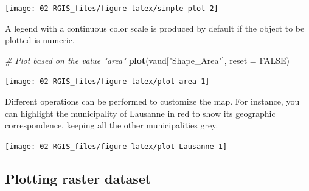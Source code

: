 \documentclass[
]{article}
\newenvironment{Shaded}{\begin{snugshade}}{\end{snugshade}}
\newcommand{\AttributeTok}[1]{\textcolor[rgb]{0.13,0.29,0.53}{#1}}
\newcommand{\CommentTok}[1]{\textcolor[rgb]{0.56,0.35,0.01}{\textit{#1}}}
\newcommand{\ConstantTok}[1]{\textcolor[rgb]{0.56,0.35,0.01}{#1}}
\newcommand{\FunctionTok}[1]{\textcolor[rgb]{0.13,0.29,0.53}{\textbf{#1}}}
\newcommand{\NormalTok}[1]{#1}
\newcommand{\OtherTok}[1]{\textcolor[rgb]{0.56,0.35,0.01}{#1}}
\newcommand{\SpecialCharTok}[1]{\textcolor[rgb]{0.81,0.36,0.00}{\textbf{#1}}}
\newcommand{\StringTok}[1]{\textcolor[rgb]{0.31,0.60,0.02}{#1}}
\begin{document}
\begin{center}\texttt{[image: 02-RGIS\_files/figure-latex/simple-plot-2]} \end{center}

A legend with a continuous color scale is produced by default if the object to be plotted is numeric.

\begin{Shaded}
\begin{Highlighting}[]
\CommentTok{\# Plot based on the value "area" }
\FunctionTok{plot}\NormalTok{(vaud[}\StringTok{"Shape\_Area"}\NormalTok{], }\AttributeTok{reset =} \ConstantTok{FALSE}\NormalTok{)}
\end{Highlighting}
\end{Shaded}

\begin{center}\texttt{[image: 02-RGIS\_files/figure-latex/plot-area-1]} \end{center}

Different operations can be performed to customize the map. For instance, you can highlight the municipality of Lausanne in red to show its geographic correspondence, keeping all the other municipalities grey.

\begin{Shaded}
\end{Shaded}

\begin{center}\texttt{[image: 02-RGIS\_files/figure-latex/plot-Lausanne-1]} \end{center}

\subsection{Plotting raster dataset}\label{plotting-raster-dataset}
\end{document}

